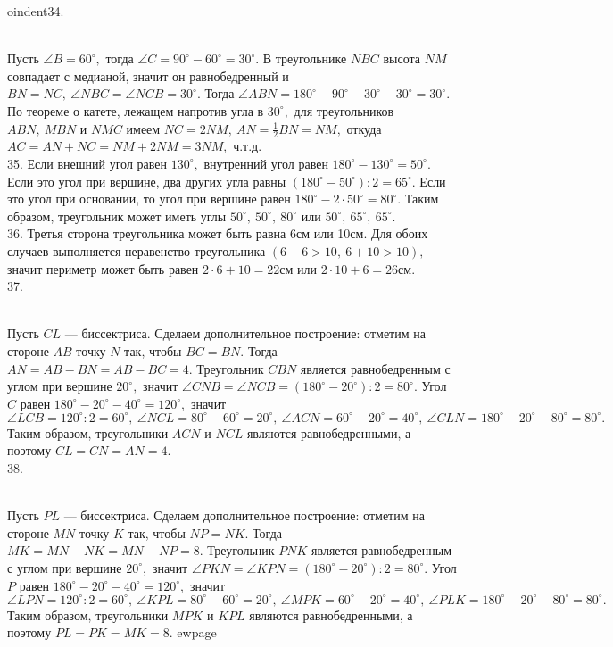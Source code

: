 oindent34. \begin{figure}[ht!]
\end{figure}\\
Пусть $\angle B=60^\circ,$ тогда $\angle C=90^\circ-60^\circ=30^\circ.$ В треугольнике $NBC$ высота $NM$ совпадает с медианой, значит он равнобедренный и $BN=NC,\ \angle NBC=\angle NCB=30^\circ.$ Тогда $\angle ABN=180^\circ-90^\circ-30^\circ-30^\circ=30^\circ.$ По теореме о катете, лежащем напротив угла в $30^\circ,$ для треугольников $ABN,\ MBN$ и $NMC$ имеем $NC=2NM,\ AN=\frac{1}{2}BN=NM,$ откуда $AC=AN+NC=NM+2NM=3NM,$ ч.т.д.\\
35. Если внешний угол равен $130^\circ,$ внутренний угол равен $180^\circ-130^\circ=50^\circ.$ Если это угол при вершине, два других угла равны $(180^\circ-50^\circ):2=65^\circ.$ Если это угол при основании, то угол при вершине равен $180^\circ-2\cdot50^\circ=80^\circ.$ Таким образом, треугольник может иметь углы  $50^\circ,\ 50^\circ,\ 80^\circ$ или $50^\circ,\ 65^\circ,\ 65^\circ.$\\
36. Третья сторона треугольника может быть равна 6см или 10см. Для обоих случаев выполняется неравенство треугольника $(6+6>10,\ 6+10>10),$ значит периметр может быть равен $2\cdot6+10=22$см или $2\cdot10+6=26$см.\\
37. \begin{figure}[ht!]
\end{figure}\\
Пусть $CL$ --- биссектриса. Сделаем дополнительное построение: отметим на стороне $AB$ точку $N$ так, чтобы $BC=BN.$ Тогда $AN=AB-BN=AB-BC=4.$ Треугольник $CBN$ является равнобедренным с углом при вершине $20^\circ,$ значит $\angle CNB=\angle NCB=(180^\circ-20^\circ):2=80^\circ.$ Угол $C$ равен $180^\circ-20^\circ-40^\circ=120^\circ,$ значит $\angle LCB=120^\circ:2=60^\circ,\ \angle NCL=80^\circ-60^\circ=20^\circ,\ \angle ACN=60^\circ-20^\circ=40^\circ,\ \angle CLN=180^\circ-20^\circ-80^\circ=80^\circ.$ Таким образом, треугольники $ACN$ и $NCL$ являются равнобедренными, а поэтому $CL=CN=AN=4.$\\
38. \begin{figure}[ht!]
\end{figure}\\
Пусть $PL$ --- биссектриса. Сделаем дополнительное построение: отметим на стороне $MN$ точку $K$ так, чтобы $NP=NK.$ Тогда $MK=MN-NK=MN-NP=8.$ Треугольник $PNK$ является равнобедренным с углом при вершине $20^\circ,$ значит $\angle PKN=\angle KPN=(180^\circ-20^\circ):2=80^\circ.$ Угол $P$ равен $180^\circ-20^\circ-40^\circ=120^\circ,$ значит $\angle LPN=120^\circ:2=60^\circ,\ \angle KPL=80^\circ-60^\circ=20^\circ,\ \angle MPK=60^\circ-20^\circ=40^\circ,\ \angle PLK=180^\circ-20^\circ-80^\circ=80^\circ.$ Таким образом, треугольники $MPK$ и $KPL$ являются равнобедренными, а поэтому $PL=PK=MK=8.$
ewpage

